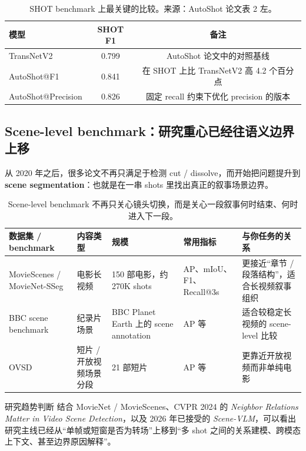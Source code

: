 \documentclass[a4paper]{article}
\begin{document}
\begin{table}[H]
\centering
\small
\begin{tabular}{lcc}
\toprule
模型 & SHOT F1 & 备注 \\
\midrule
TransNetV2 & 0.799 & AutoShot 论文中的对照基线 \\
AutoShot@F1 & 0.841 & 在 SHOT 上比 TransNetV2 高 4.2 个百分点 \\
AutoShot@Precision & 0.826 & 固定 recall 约束下优化 precision 的版本 \\
\bottomrule
\end{tabular}
\caption{SHOT benchmark 上最关键的比较。来源：AutoShot 论文表 2 左。}
\end{table}

\subsection{Scene-level benchmark：研究重心已经往语义边界上移}

从 2020 年之后，很多论文不再只满足于检测 cut / dissolve，而开始把问题提升到 \textbf{scene segmentation}：也就是在一串 shots 里找出真正的叙事场景边界。

\begin{table}[H]
\centering
\small
\begin{tabularx}{\textwidth}{p{2.7cm}p{2.7cm}p{3.0cm}p{2.7cm}Y}
\toprule
数据集 / benchmark & 内容类型 & 规模 & 常用指标 & 与你任务的关系 \\
\midrule
MovieScenes / MovieNet-SSeg & 电影长视频 & 150 部电影，约 270K shots & AP、mIoU、F1、Recall@3s & 更接近“章节 / 段落结构”，适合长视频叙事组织 \\
BBC scene benchmark & 纪录片场景 & BBC Planet Earth 上的 scene annotation & AP 等 & 适合较稳定长视频的 scene-level 比较 \\
OVSD & 短片 / 开放视频场景分段 & 21 部短片 & AP 等 & 更靠近开放视频而非单纯电影 \\
\bottomrule
\end{tabularx}
\caption{Scene-level benchmark 不再只关心镜头切换，而是关心一段叙事何时结束、何时进入下一段。}
\end{table}

\begin{findingbox}{研究趋势判断}
结合 MovieNet / MovieScenes、CVPR 2024 的 \textit{Neighbor Relations Matter in Video Scene Detection}，以及 2026 年已接受的 \textit{Scene-VLM}，可以看出研究主线已经从“单帧或短窗是否为转场”上移到“多 shot 之间的关系建模、跨模态上下文、甚至边界原因解释”。
\end{findingbox}
\end{document}
